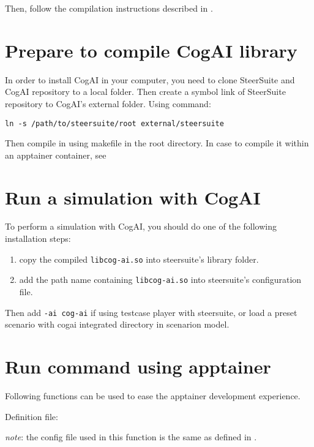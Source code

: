 Then, follow the compilation instructions described in .

\section{Prepare to compile CogAI library}

In order to install CogAI in your computer, you need to clone SteerSuite and CogAI repository to a local folder. Then 
create a symbol link of SteerSuite repository to CogAI's external folder. Using command:
\begin{verbatim}
ln -s /path/to/steersuite/root external/steersuite
\end{verbatim}

Then compile in using makefile in the root directory. In case to compile it within an apptainer container, see 

\section{Run a simulation with CogAI}

To perform a simulation with CogAI, you should do one of the following installation steps:

\begin{enumerate}
  \item copy the compiled \texttt{libcog-ai.so} into steersuite's library folder.
  \item add the path name containing \texttt{libcog-ai.so} into steersuite's configuration file.
\end{enumerate}

Then add \texttt{-ai cog-ai} if using testcase player with steersuite, or load a preset scenario with cogai 
integrated directory in scenarion model.

\section{Run command using apptainer}
\label{sec:cogai-apptainer}
Following functions can be used to ease the apptainer development experience.

Definition file: 

\textit{note}: the config file used in this function is the same as defined in .

\printbibliography
